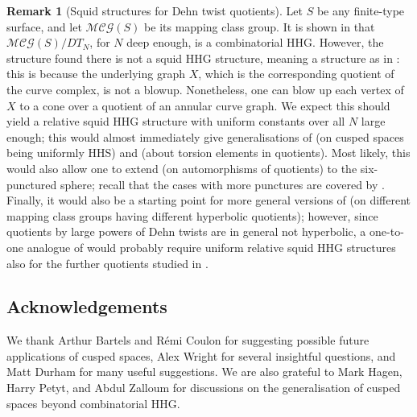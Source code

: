 \documentclass[svgnames]{amsart}
\theoremstyle{plain}
\theoremstyle{definition}
\newtheorem{remintro}[thmintro]{Remark}
\newcommand{\squid}[1]{squid}
\newcommand{\Squid}[1]{Squid}
\newcommand{\MCG}{\mathcal{MCG}}
\begin{document}
\begin{remintro}[\Squid{} structures for Dehn twist quotients]
    \label{rmk:Giorgios_homework}
Let $S$ be any finite-type surface, and let $\MCG(S)$ be its mapping class group. It is shown in \cite{BHMS} that $\MCG(S)/DT_N$, for $N$ deep enough, is a combinatorial HHG. However, the structure found there is not a \squid{} HHG structure, meaning a structure as in : this is because the underlying graph $X$, which is the corresponding quotient of the curve complex, is not a blowup. Nonetheless, one can blow up each vertex of $X$ to a cone over a quotient of an annular curve graph. We expect this should yield a relative \squid{} HHG structure with uniform constants over all $N$ large enough; this would almost immediately give generalisations of  (on cusped spaces being uniformly HHS) and  (about torsion elements in quotients). Most likely, this would also allow one to extend  (on automorphisms of quotients) to the six-punctured sphere; recall that the cases with more punctures are covered by \cite{rigidity_mcg_mod_dt}. Finally, it would also be a starting point for more general versions of  (on different mapping class groups having different hyperbolic quotients); however, since quotients by large powers of Dehn twists are in general not hyperbolic, a one-to-one analogue of  would probably require uniform relative \squid{} HHG structures also for the further quotients studied in \cite{BHMS}.
\end{remintro}





\subsection*{Acknowledgements}
We thank Arthur Bartels and R\'{e}mi Coulon for suggesting possible future applications of cusped spaces, Alex Wright for several insightful questions, and Matt Durham for many useful suggestions. We are also grateful to Mark Hagen, Harry Petyt, and Abdul Zalloum for discussions on the generalisation of cusped spaces beyond combinatorial HHG.
\end{document}
